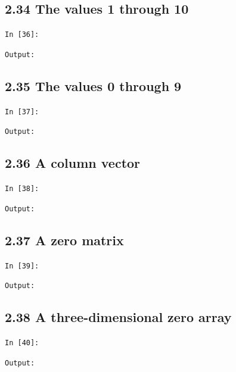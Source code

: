 \documentclass[11pt]{article}
\begin{document}
\par\medskip\noindent\begin{minipage}{\linewidth}
\subsection*{2.34 The values 1 through 10}
\noindent\texttt{In [36]:}

\noindent\texttt{Output:}

\end{minipage}\par

\par\medskip\noindent\begin{minipage}{\linewidth}
\subsection*{2.35 The values 0 through 9}
\noindent\texttt{In [37]:}

\noindent\texttt{Output:}

\end{minipage}\par

\par\medskip\noindent\begin{minipage}{\linewidth}
\subsection*{2.36 A column vector}
\noindent\texttt{In [38]:}

\noindent\texttt{Output:}

\end{minipage}\par

\par\medskip\noindent\begin{minipage}{\linewidth}
\subsection*{2.37 A zero matrix}
\noindent\texttt{In [39]:}

\noindent\texttt{Output:}

\end{minipage}\par

\par\medskip\noindent\begin{minipage}{\linewidth}
\subsection*{2.38 A three-dimensional zero array}
\noindent\texttt{In [40]:}

\noindent\texttt{Output:}

\end{minipage}\par
\end{document}
